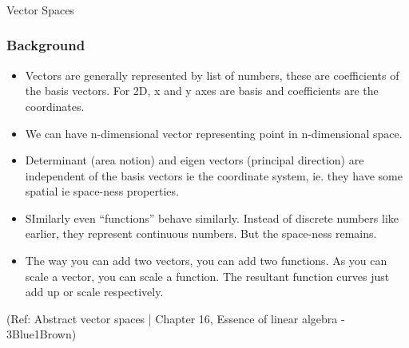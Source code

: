 \newtheorem*{remark}{Remark}
\newcommand{\dotprod}{ \cdot }

\newcommand{\colvec}[1]{\ensuremath{\begin{pmatrix}#1\end{pmatrix}}}




\begin{frame}[fragile]\frametitle{}
\begin{center}
{\Large Vector Spaces }
\end{center}
\end{frame}



\begin{frame}[fragile]
\frametitle{Background}
\begin{itemize}
\item Vectors are generally represented by list of numbers, these are coefficients of the basis vectors. For 2D, x and y axes are basis and coefficients are the coordinates.
\item We can have n-dimensional vector representing point in n-dimensional space.
\item Determinant (area notion) and eigen vectors (principal direction) are independent of the basis vectors ie the coordinate system, ie. they have some spatial ie space-ness properties.
\item SImilarly even ``functions'' behave similarly. Instead of discrete numbers like earlier, they represent continuous numbers. But the space-ness remains.
\item The way you can add two vectors, you can add two functions. As you can scale a vector, you can scale a function. The resultant function curves just add up or scale respectively.
\end{itemize}


\tiny{(Ref: Abstract vector spaces | Chapter 16, Essence of linear algebra - 3Blue1Brown)}


\end{frame}

